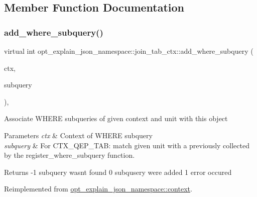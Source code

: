 \subsection{Member Function Documentation}
\mbox{\label{classopt__explain__json__namespace_1_1join__tab__ctx_a6884d85a538e28bfac75c41159438d01}} 
\subsubsection{\texorpdfstring{add\+\_\+where\+\_\+subquery()}{add\_where\_subquery()}}
{\footnotesize\ttfamily virtual int opt\+\_\+explain\+\_\+json\+\_\+namespace\+::join\+\_\+tab\+\_\+ctx\+::add\+\_\+where\+\_\+subquery (\begin{DoxyParamCaption}\item[{\mbox{\hyperlink{classopt__explain__json__namespace_1_1subquery__ctx}{subquery\+\_\+ctx}} $\ast$}]{ctx,  }\item[{S\+E\+L\+E\+C\+T\+\_\+\+L\+E\+X\+\_\+\+U\+N\+IT $\ast$}]{subquery }\end{DoxyParamCaption})\hspace{0.3cm}{\ttfamily [inline]}, {\ttfamily [virtual]}}

Associate W\+H\+E\+RE subqueries of given context and unit with this object


\begin{DoxyParams}{Parameters}
{\em ctx} & Context of W\+H\+E\+RE subquery \\
\hline
{\em subquery} & For C\+T\+X\+\_\+\+Q\+E\+P\+\_\+\+T\+AB\+: match given unit with a previously collected by the register\+\_\+where\+\_\+subquery function. \\
\hline
\end{DoxyParams}
\begin{DoxyReturn}{Returns}
-\/1 subquery wasn\textquotesingle{}t found 0 subqusery were added 1 error occured 
\end{DoxyReturn}


Reimplemented from \mbox{\hyperlink{classopt__explain__json__namespace_1_1context_ae6606674e90fec03200823c35994873c}{opt\+\_\+explain\+\_\+json\+\_\+namespace\+::context}}.

